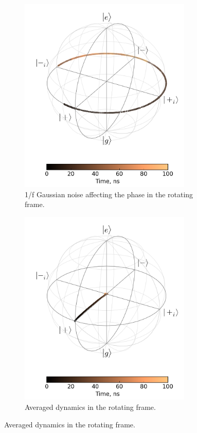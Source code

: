\documentclass[12pt]{report}
\numberwithin{equation}{section}
\begin{document}
\begin{figure}
\begingroup
\captionsetup[subfigure]{width=0.9\textwidth}
\centering
\begin{subfigure}[t]{0.45\textwidth}
\centering
\includegraphics[width=0.9\textwidth]{cdeph_bloch_rf_pink}
\caption{1/f Gaussian noise affecting the phase in the rotating frame.}
\end{subfigure}
\begin{subfigure}[t]{0.45\textwidth}
\centering
\includegraphics[width=0.9\textwidth]{cdeph_bloch_rf_avg_pink}
\caption{Averaged dynamics in the rotating frame.}
\end{subfigure}


\end{figure}
\end{document}
